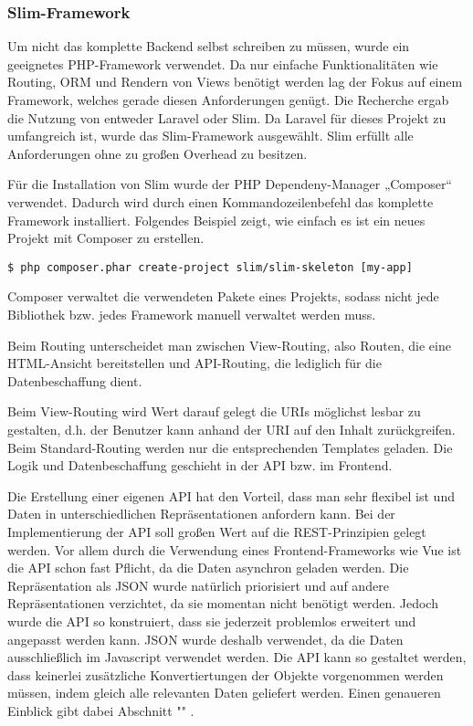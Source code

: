 \subsubsection{Slim-Framework}  
\label{sec:Slim-Framework-1}

Um nicht das komplette Backend selbst schreiben zu müssen, wurde ein geeignetes PHP-Framework verwendet. Da nur einfache Funktionalitäten wie Routing, \ac{ORM} und Rendern von Views benötigt werden lag der Fokus auf einem Framework, welches gerade diesen Anforderungen genügt. Die Recherche ergab die Nutzung von entweder Laravel oder Slim. Da Laravel für dieses Projekt zu umfangreich ist, wurde das Slim-Framework ausgewählt. Slim erfüllt alle Anforderungen ohne zu großen Overhead zu besitzen. 

Für die Installation von Slim wurde der PHP Dependeny-Manager „Composer“ verwendet. Dadurch wird durch einen Kommandozeilenbefehl das komplette Framework installiert.
Folgendes Beispiel zeigt, wie einfach es ist ein neues Projekt mit Composer zu erstellen.
 
\begin{lstlisting}[frame=single] 
$ php composer.phar create-project slim/slim-skeleton [my-app]
\end{lstlisting}

Composer verwaltet die verwendeten Pakete eines Projekts, sodass nicht jede Bibliothek bzw. jedes Framework manuell verwaltet werden muss.	

Beim Routing unterscheidet man zwischen View-Routing, also Routen, die eine HTML-Ansicht bereitstellen und API-Routing, die lediglich für die Datenbeschaffung dient. 

Beim View-Routing wird Wert darauf gelegt die URIs möglichst lesbar zu gestalten, d.h. der Benutzer kann anhand der URI auf den Inhalt zurückgreifen. 
Beim Standard-Routing werden nur die entsprechenden Templates geladen. Die Logik und Datenbeschaffung geschieht in der API bzw. im Frontend.

Die Erstellung einer eigenen API hat den Vorteil, dass man sehr flexibel ist und Daten in unterschiedlichen Repräsentationen anfordern kann. Bei der Implementierung der API soll großen Wert auf die REST-Prinzipien gelegt werden. 
Vor allem durch die Verwendung eines Frontend-Frameworks wie Vue ist die API schon fast Pflicht, da die Daten asynchron geladen werden.
Die Repräsentation als JSON wurde natürlich priorisiert und auf andere Repräsentationen verzichtet, da sie momentan nicht benötigt werden. Jedoch wurde die API so konstruiert, dass sie jederzeit problemlos erweitert und angepasst werden kann. JSON wurde deshalb verwendet, da die Daten ausschließlich im Javascript verwendet werden. Die API kann so gestaltet werden, dass keinerlei zusätzliche Konvertiertungen der Objekte vorgenommen werden müssen, indem gleich alle relevanten Daten geliefert werden.
Einen genaueren Einblick gibt dabei Abschnitt "" .

